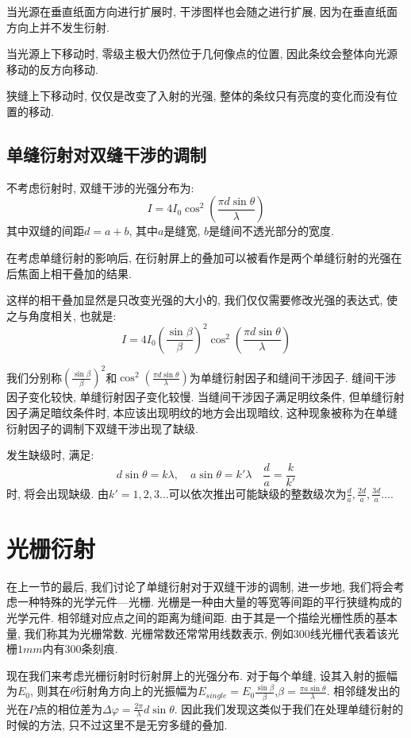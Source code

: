 当光源在垂直纸面方向进行扩展时, 干涉图样也会随之进行扩展, 因为在垂直纸面方向上并不发生衍射.

当光源上下移动时, 零级主极大仍然位于几何像点的位置, 因此条纹会整体向光源移动的反方向移动.

狭缝上下移动时, 仅仅是改变了入射的光强, 整体的条纹只有亮度的变化而没有位置的移动.

\subsection{单缝衍射对双缝干涉的调制}
不考虑衍射时, 双缝干涉的光强分布为:
\[
I = 4I_0\cos^2\!\left(\frac{\pi d\sin\theta}{\lambda}\right)
\]
其中双缝的间距$d=a+b$, 其中$a$是缝宽, $b$是缝间不透光部分的宽度.

在考虑单缝衍射的影响后, 在衍射屏上的叠加可以被看作是两个单缝衍射的光强在后焦面上相干叠加的结果.


这样的相干叠加显然是只改变光强的大小的, 我们仅仅需要修改光强的表达式, 使之与角度相关, 也就是:
\[
I = 4I_0(\frac{\sin\beta}{\beta})^2\cos^2(\frac{\pi d\sin\theta}{\lambda})
\]

我们分别称$(\frac{\sin\beta}{\beta})^2$和$\cos^2(\frac{\pi d\sin\theta}{\lambda})$为单缝衍射因子和缝间干涉因子. 缝间干涉因子变化较快, 单缝衍射因子变化较慢. 当缝间干涉因子满足明纹条件, 但单缝衍射因子满足暗纹条件时, 本应该出现明纹的地方会出现暗纹, 这种现象被称为在单缝衍射因子的调制下双缝干涉出现了缺级.

发生缺级时, 满足:
\[
d\sin\theta = k\lambda, \quad a\sin\theta = k'\lambda \quad \frac{d}{a} = \frac{k}{k'}
\]
时, 将会出现缺级. 由$k'=1,2,3\dots$可以依次推出可能缺级的整数级次为$\frac{d}{a},\frac{2d}{a},\frac{3d}{a}\dots$.
\section{光栅衍射}
在上一节的最后, 我们讨论了单缝衍射对于双缝干涉的调制, 进一步地, 我们将会考虑一种特殊的光学元件---光栅. 光栅是一种由大量的等宽等间距的平行狭缝构成的光学元件. 相邻缝对应点之间的距离为缝间距. 由于其是一个描绘光栅性质的基本量, 我们称其为光栅常数. 光栅常数还常常用线数表示, 例如$300$线光栅代表着该光栅$1mm$内有$300$条刻痕.


现在我们来考虑光栅衍射时衍射屏上的光强分布. 对于每个单缝, 设其入射的振幅为$E_0$, 则其在$\theta$衍射角方向上的光振幅为$E_{single}=E_0\frac{\sin \beta}{\beta}$,$\beta= \frac{\pi a\sin\theta}{\lambda}$. 相邻缝发出的光在$P$点的相位差为$\Delta \varphi= \frac{2\pi}{\lambda}d\sin\theta$. 因此我们发现这类似于我们在处理单缝衍射的时候的方法, 只不过这里不是无穷多缝的叠加.


